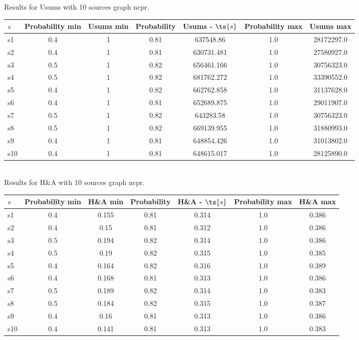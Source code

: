 \documentclass{article}
\begin{document}
\noindent Results for Usums with 10 sources graph ncpr.

\noindent\begin{tabular}{|l|c|c|c|c|c|c|}
\hline
$s$& Probability min & Usums min & Probability & Usums - $\ts{s}$ & Probability max & Usums max\\
\hline
s1 &0.4 & 1 & 0.81 & 637548.86 & 1.0 & 28172297.0\\
\hline
s2 &0.4 & 1 & 0.81 & 630731.481 & 1.0 & 27580927.0\\
\hline
s3 &0.5 & 1 & 0.82 & 656461.166 & 1.0 & 30756323.0\\
\hline
s4 &0.5 & 1 & 0.82 & 681762.272 & 1.0 & 33390552.0\\
\hline
s5 &0.4 & 1 & 0.82 & 662762.858 & 1.0 & 31137628.0\\
\hline
s6 &0.4 & 1 & 0.81 & 652689.875 & 1.0 & 29011907.0\\
\hline
s7 &0.5 & 1 & 0.82 & 643283.58 & 1.0 & 30756323.0\\
\hline
s8 &0.5 & 1 & 0.82 & 669139.955 & 1.0 & 31880993.0\\
\hline
s9 &0.4 & 1 & 0.81 & 648854.426 & 1.0 & 31013802.0\\
\hline
s10 &0.4 & 1 & 0.81 & 648615.017 & 1.0 & 28125890.0\\
\hline
\end{tabular}\\

\noindent Results for H\&A with 10 sources graph ncpr.

\noindent\begin{tabular}{|l|c|c|c|c|c|c|}
\hline
$s$& Probability min & H\&A min & Probability & H\&A - $\ts{s}$ & Probability max & H\&A max\\
\hline
s1 &0.4 & 0.155 & 0.81 & 0.314 & 1.0 & 0.386\\
\hline
s2 &0.4 & 0.15 & 0.81 & 0.312 & 1.0 & 0.386\\
\hline
s3 &0.5 & 0.194 & 0.82 & 0.314 & 1.0 & 0.386\\
\hline
s4 &0.5 & 0.19 & 0.82 & 0.315 & 1.0 & 0.385\\
\hline
s5 &0.4 & 0.164 & 0.82 & 0.316 & 1.0 & 0.389\\
\hline
s6 &0.4 & 0.168 & 0.81 & 0.313 & 1.0 & 0.386\\
\hline
s7 &0.5 & 0.189 & 0.82 & 0.314 & 1.0 & 0.383\\
\hline
s8 &0.5 & 0.184 & 0.82 & 0.315 & 1.0 & 0.387\\
\hline
s9 &0.4 & 0.16 & 0.81 & 0.313 & 1.0 & 0.386\\
\hline
s10 &0.4 & 0.141 & 0.81 & 0.313 & 1.0 & 0.383\\
\hline
\end{tabular}\\
\end{document}
